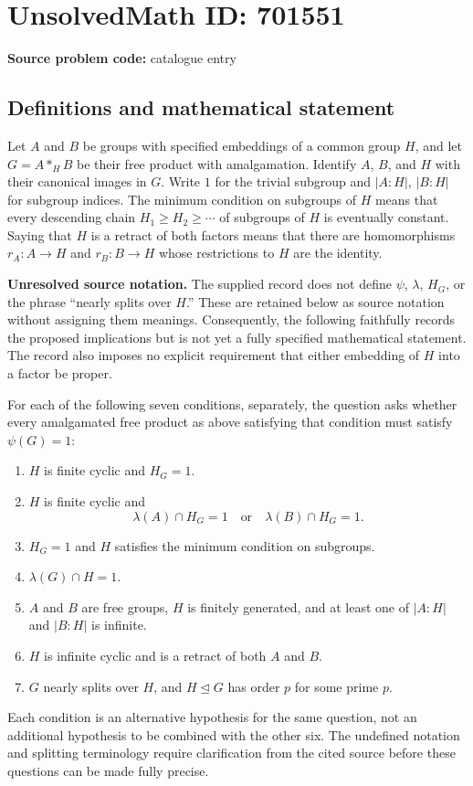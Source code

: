 \documentclass[11pt]{article}
\begin{document}
\section*{UnsolvedMath ID: 701551}
\textbf{Source problem code:} catalogue entry
\subsection{Definitions and mathematical statement}
Let \(A\) and \(B\) be groups with specified embeddings of a common group \(H\), and let \(G=A\ast_H B\) be their free product with amalgamation. Identify \(A\), \(B\), and \(H\) with their canonical images in \(G\). Write \(1\) for the trivial subgroup and \(|A:H|\), \(|B:H|\) for subgroup indices. The minimum condition on subgroups of \(H\) means that every descending chain \(H_1\ge H_2\ge\cdots\) of subgroups of \(H\) is eventually constant. Saying that \(H\) is a retract of both factors means that there are homomorphisms \(r_A:A\to H\) and \(r_B:B\to H\) whose restrictions to \(H\) are the identity.

\textbf{Unresolved source notation.} The supplied record does not define \(\psi\), \(\lambda\), \(H_G\), or the phrase ``nearly splits over \(H\).'' These are retained below as source notation without assigning them meanings. Consequently, the following faithfully records the proposed implications but is not yet a fully specified mathematical statement. The record also imposes no explicit requirement that either embedding of \(H\) into a factor be proper.

For each of the following seven conditions, separately, the question asks whether every amalgamated free product as above satisfying that condition must satisfy \(\psi(G)=1\):
\begin{enumerate}
\item[(a)] \(H\) is finite cyclic and \(H_G=1\).
\item[(b)] \(H\) is finite cyclic and
\[
\lambda(A)\cap H_G=1\quad\text{or}\quad\lambda(B)\cap H_G=1.
\]
\item[(c)] \(H_G=1\) and \(H\) satisfies the minimum condition on subgroups.
\item[(d)] \(\lambda(G)\cap H=1\).
\item[(e)] \(A\) and \(B\) are free groups, \(H\) is finitely generated, and at least one of \(|A:H|\) and \(|B:H|\) is infinite.
\item[(f)] \(H\) is infinite cyclic and is a retract of both \(A\) and \(B\).
\item[(g)] \(G\) nearly splits over \(H\), and \(H\trianglelefteq G\) has order \(p\) for some prime \(p\).
\end{enumerate}
Each condition is an alternative hypothesis for the same question, not an additional hypothesis to be combined with the other six. The undefined notation and splitting terminology require clarification from the cited source before these questions can be made fully precise.
\end{document}
